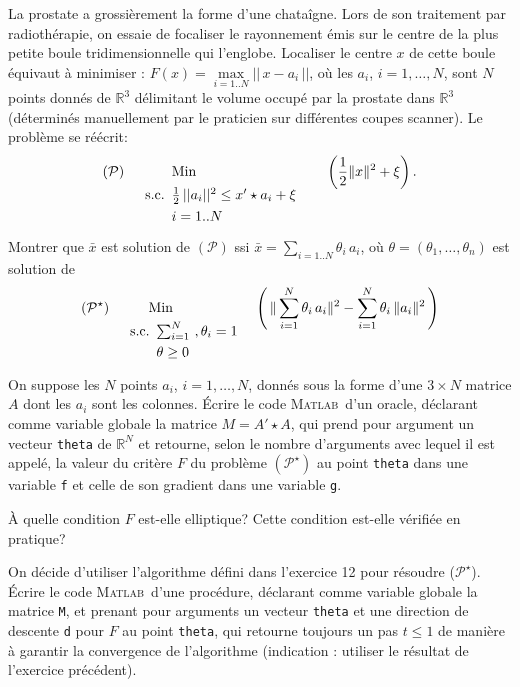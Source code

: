 \documentclass[12pt,a4paper,fleqn]{report}
\newcommand{\matlab}{\textsc{Matlab}}
\newcommand{\R}{\mathbb R}
\renewcommand{\P}{\mathcal P}
\newcommand{\push}[1]{\rule{0pt}{0pt}\hspace{#1pt}}
\begin{document}
\begin{exercice}
La prostate a grossi\`erement la forme d'une chataîgne. Lors de son traitement par radioth\'erapie, on essaie de focaliser le rayonnement \'emis sur le centre de la plus petite boule tridimensionnelle qui l'englobe. Localiser le centre $x$ de cette boule \'equivaut \`a minimiser : $ F(x)=\underset{i=1..N}{\max} ||\,x-a_i\,|| $, o\`u les $a_i$, $i=1,\ldots,N$, sont $N$ points donn\'es de $\R^3$ d\'elimitant le volume occup\'e par la prostate dans $\R^3$ (d\'etermin\'es manuellement par le praticien sur diff\'erentes coupes scanner).
Le probl\`eme se r\'e\'ecrit:
\[
 (\P) \push{15}\underset{\rule{0pt}{15pt}\mbox{s.c.}\push{5}\parbox[t]{100pt}{$\frac{1}{2}\,||a_i||^2\leq x'\star a_i + \xi$ \\ \rule{0pt}{11pt}$i=1..N$}}{\mbox{Min \rule{60pt}{0pt}}} \push{10}\left( \frac{1}{2} \| x\|^2 +\xi \right).
\]
\begin{questions}
\item Montrer que $\bar x$ est solution de $(\P)$ ssi $\bar x=\sum_{i=1..N} \theta_i \,a_i$, o\`u $ \theta=( \theta_1, \ldots, \theta_n)$ est solution de
\[
(\P^{\star})\push{15}\underset{\rule{0pt}{15pt} \mbox{s.c.}\push{5}\parbox[t]{70pt}{$\sum_{i=1}^N \ ,\theta_i=1$\\ \rule{0pt}{11pt}$ \theta \geq 0$}}{\mbox{Min}\rule{45pt}{0pt}} \left(\,\|\sum_{i=1}^N \theta_i\,a_i\|^2-\sum_{i=1}^N \theta_i\,\|a_i\|^2\,\right)
\]
\item On suppose les $N$ points $a_i$, $i=1,\ldots,N$, donn\'es sous la forme d'une $3\times N$ matrice $A$ dont les $a_i$ sont les colonnes. \'Ecrire le code \matlab\ d'un oracle, d\'eclarant comme variable globale la matrice $M=A' \star A$, qui prend pour argument un vecteur \texttt{theta} de $\R^N$ et retourne, selon le nombre d'arguments avec lequel il est appel\'e, la valeur du crit\`ere $F$ du probl\`eme $(\P^{\star})$ au point \texttt{theta} dans une variable  \texttt f et celle de son gradient dans une variable \texttt g.
\item \`A quelle condition $F$ est-elle elliptique? Cette condition est-elle v\'erifi\'ee en pratique?
\item On d\'ecide d'utiliser l'algorithme d\'efini dans l'exercice 12 pour r\'esoudre ($\P^{\star}$). \'Ecrire le code \matlab\ d'une proc\'edure, d\'eclarant comme variable globale la matrice \texttt M, et prenant pour arguments un vecteur \texttt{theta} et une direction de descente \texttt d pour $F$ au point \texttt{theta}, qui retourne toujours un pas $t\leq 1$ de mani\`ere \`a garantir la convergence de l'algorithme (indication : utiliser le r\'esultat de l'exercice pr\'ec\'edent).
\end{questions}
\end{exercice}
\end{document}
